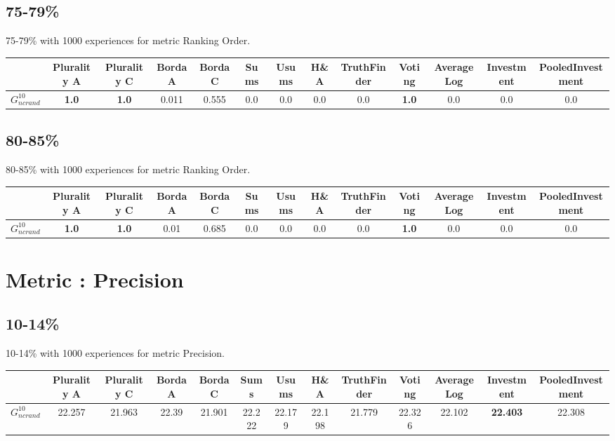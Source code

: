 \documentclass{article}
\newcommand{\graph}[2]{$G_{#1}^{#2}$}
\begin{document}
\subsection{75-79\%}

75-79\% with 1000 experiences for metric Ranking Order.

\noindent\begin{tabular}{|l|c|c|c|c|c|c|c|c|c|c|c|c|}
\hline
& Plurality A& Plurality C& Borda A& Borda C& Sums& Usums& H\&A& TruthFinder& Voting& AverageLog& Investment& PooledInvestment\\
\hline
\graph{ncrand}{10} &\textbf{1.0}&\textbf{1.0}&0.011&0.555&0.0&0.0&0.0&0.0&\textbf{1.0}&0.0&0.0&0.0\\
\hline
\end{tabular}
\newpage

\subsection{80-85\%}

80-85\% with 1000 experiences for metric Ranking Order.

\noindent\begin{tabular}{|l|c|c|c|c|c|c|c|c|c|c|c|c|}
\hline
& Plurality A& Plurality C& Borda A& Borda C& Sums& Usums& H\&A& TruthFinder& Voting& AverageLog& Investment& PooledInvestment\\
\hline
\graph{ncrand}{10} &\textbf{1.0}&\textbf{1.0}&0.01&0.685&0.0&0.0&0.0&0.0&\textbf{1.0}&0.0&0.0&0.0\\
\hline
\end{tabular}
\newpage
\newpage
\section{Metric : Precision}

\newpage

\subsection{10-14\%}

10-14\% with 1000 experiences for metric Precision.

\noindent\begin{tabular}{|l|c|c|c|c|c|c|c|c|c|c|c|c|}
\hline
& Plurality A& Plurality C& Borda A& Borda C& Sums& Usums& H\&A& TruthFinder& Voting& AverageLog& Investment& PooledInvestment\\
\hline
\graph{ncrand}{10} &22.257&21.963&22.39&21.901&22.222&22.179&22.198&21.779&22.326&22.102&\textbf{22.403}&22.308\\
\hline
\end{tabular}
\newpage
\end{document}
